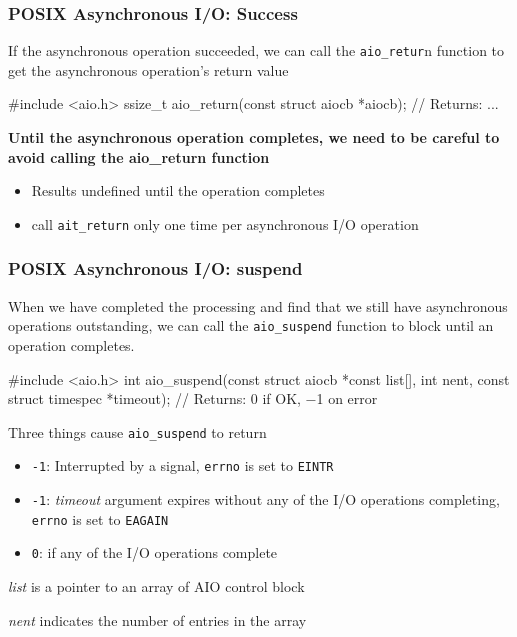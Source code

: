 \documentclass[newPxFont,sthlmFooter,nooffset]{beamer}
\begin{document}
\begin{frame}[t, fragile]
  \frametitle{POSIX Asynchronous I/O: Success}
If the asynchronous operation succeeded, we can call the \texttt{aio\_retur}n function to get the asynchronous operation’s return value
\begin{codedef}
#include <aio.h>
ssize_t aio_return(const struct aiocb *aiocb);
// Returns: ...
\end{codedef}
\textbf{Until the asynchronous operation completes, we need to be careful to avoid calling the aio\_return function}
\begin{itemize}
\item Results undefined until the operation completes
\item call \texttt{ait\_return} only one time per asynchronous I/O operation
\end{itemize}
\end{frame}


\begin{frame}[t, fragile]
  \frametitle{POSIX Asynchronous I/O: suspend}

When we have completed the processing and find that we still have asynchronous operations outstanding, 
we can call the \texttt{aio\_suspend} function to block until an operation completes.

\begin{codedef}
#include <aio.h>
int aio_suspend(const struct aiocb *const list[], int nent,
                const struct timespec *timeout);
// Returns: 0 if OK, −1 on error
\end{codedef}

Three things cause \texttt{aio\_suspend} to return
{\footnotesize
\begin{itemize}
  \item \texttt{-1}: Interrupted by a signal, \texttt{errno} is set to
    \texttt{EINTR}
  \item \texttt{-1}: \textit{timeout} argument expires without any of the I/O operations completing, \texttt{errno} is set to \texttt{EAGAIN}
\item \texttt{0}: if any of the I/O operations complete
\end{itemize}
}
\textit{list}  is a pointer to an array of AIO control block

\textit{nent} indicates the number of entries in the array
\end{frame}
\end{document}
